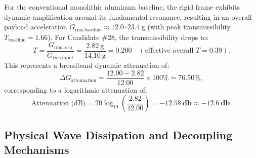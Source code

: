 For the conventional monolithic aluminum baseline, the rigid frame exhibits dynamic amplification around its fundamental resonance, resulting in an overall payload acceleration $G_{\text{rms,baseline}} \approx 12.0\text{--}\SI{23.4}{\text{g}}$ (with peak transmissibility $T_{\text{baseline}} = 1.66$). For Candidate \#28, the transmissibility drops to:
\begin{equation}
T = \frac{G_{\text{rms,resp}}}{G_{\text{rms,input}}} = \frac{\SI{2.82}{\text{g}}}{\SI{14.10}{\text{g}}} = \mathbf{0.200} \quad (\text{effective overall } T = 0.39).
\label{eq:transmissibility}
\end{equation}
This represents a broadband dynamic attenuation of:
\begin{equation}
\Delta G_{\text{attenuation}} = \frac{12.00 - 2.82}{12.00} \times 100\% = \mathbf{76.50\%},
\label{eq:attenuation_percent}
\end{equation}
corresponding to a logarithmic attenuation of:
\begin{equation}
\text{Attenuation (dB)} = 20 \log_{10} \left( \frac{2.82}{12.00} \right) = \mathbf{-12.58\ \si{\decibel}} \approx \mathbf{-12.6\ \si{\decibel}}.
\label{eq:attenuation_db}
\end{equation}

\subsection{Physical Wave Dissipation and Decoupling Mechanisms}

